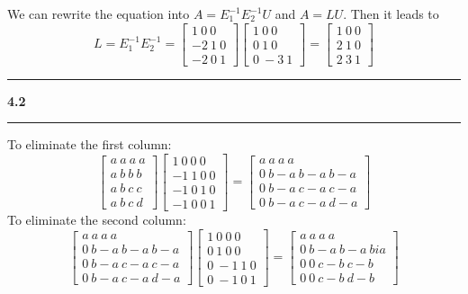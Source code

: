 \documentclass[11pt]{article}
\newcommand\question[2]{\vspace{.25in}\hrule\textbf{#1 #2}\vspace{.5em}\hrule\vspace{.10in}}
\begin{document}
We can rewrite the equation into \(A = E_1^{-1}E_2^{-1}U\) and \(A = LU\). Then it leads to 
$$L = E_1^{-1}E_2^{-1} = \begin{bmatrix} 1 \ 0 \ 0 \\ -2 \ 1 \ 0 \\ -2 \ 0 \ 1 \end{bmatrix}\begin{bmatrix} 1 \ 0 \ 0 \\ 0 \ 1 \ 0 \\ 0 \ -3 \ 1 \end{bmatrix} = \begin{bmatrix} 1 \ 0 \ 0 \\ 2 \ 1 \ 0 \\ 2 \ 3 \ 1 \end{bmatrix}$$

\question{4.2}{}
To eliminate the first column:
$$\begin{bmatrix} a \ a \ a \ a \\ a \ b \ b \ b \\ a \ b \ c \ c \\ a \ b \ c \ d \end{bmatrix}\begin{bmatrix} 1 \ 0 \ 0 \ 0 \\ -1 \ 1 \ 0 \ 0 \\ -1 \ 0 \ 1 \ 0 \\ -1 \ 0 \ 0 \ 1\end{bmatrix} = \begin{bmatrix} a \ a \ a \ a \\ 0 \ b-a \ b-a \ b-a \\ 0 \ b-a \ c-a \ c-a \\ 0 \ b-a \ c-a \ d-a \end{bmatrix}$$
To eliminate the second column:
$$\begin{bmatrix} a \ a \ a \ a \\ 0 \ b-a \ b-a \ b-a \\ 0 \ b-a \ c-a \ c-a \\ 0 \ b-a \ c-a \ d-a \end{bmatrix}\begin{bmatrix} 1 \ 0 \ 0 \ 0 \\ 0 \ 1 \ 0 \ 0 \\ 0 \ -1 \ 1 \ 0 \\ 0 \ -1 \ 0 \ 1 \end{bmatrix} = \begin{bmatrix} a \ a \ a \ a \\ 0 \ b-a \ b-a \ bia \\ 0 \ 0 \ c-b \ c-b \\ 0 \ 0 \ c-b \ d-b \end{bmatrix}$$
\end{document}
